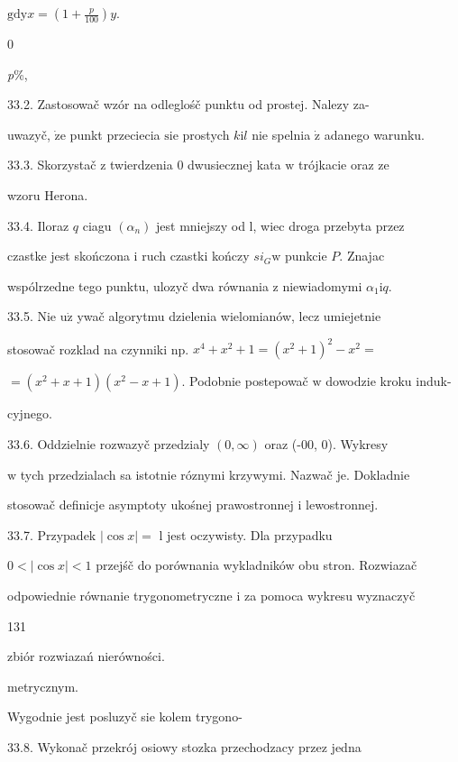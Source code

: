 \documentclass[a4paper,12pt]{article}
\begin{document}
$\mathrm{g}\mathrm{d}\mathrm{y}x= (1+\displaystyle \frac{p}{100})y.$

0

{\it p}\%,

33.2. Zastosowač wzór na odleglośč punktu od prostej. Nalezy za-

uwazyč, $\dot{\mathrm{z}}\mathrm{e}$ punkt przeciecia $\mathrm{s}\mathrm{i}\mathrm{e}$ prostych $k\mathrm{i}l$ nie spelnia $\dot{\mathrm{z}}$ adanego warunku.

33.3. Skorzystač $\mathrm{z}$ twierdzenia $0$ dwusiecznej kata $\mathrm{w}$ trójkacie oraz ze

wzoru Herona.

33.4. Iloraz $q$ ciagu $(\alpha_{n})$ jest mniejszy od l, wiec droga przebyta przez

czastke jest skończona $\mathrm{i}$ ruch czastki kończy $si_{G} \mathrm{w}$ punkcie $P$. Znajac

wspólrzedne tego punktu, ulozyč dwa równania $\mathrm{z}$ niewiadomymi $\alpha_{1}\mathrm{i}q.$

33.5. Nie $\mathrm{u}\dot{\mathrm{z}}$ ywač algorytmu dzielenia wielomianów, lecz umiejetnie

stosowač rozklad na czynniki np. $x^{4} +x^{2} + 1 = (x^{2}+1)^{2} - x^{2} =$

$=(x^{2}+x+1)(x^{2}-x+1)$. Podobnie postepowač $\mathrm{w}$ dowodzie kroku induk-

cyjnego.

33.6. Oddzielnie rozwazyč przedzialy $(0,\infty)$ oraz (-00, 0). Wykresy

$\mathrm{w}$ tych przedzialach sa istotnie róznymi krzywymi. Nazwač je. Dokladnie

stosowač definicje asymptoty ukośnej prawostronnej $\mathrm{i}$ lewostronnej.

33.7. Przypadek $|\cos x| =$ l jest oczywisty. Dla przypadku

$0< |\cos x| <1$ przejśč do porównania wykladników obu stron. Rozwiazač

odpowiednie równanie trygonometryczne $\mathrm{i}$ za pomoca wykresu wyznaczyč





131

zbiór rozwiazań nierówności.

metrycznym.

Wygodnie jest posluzyč sie kolem trygono-

33.8. Wykonač przekrój osiowy stozka przechodzacy przez jedna
\end{document}
